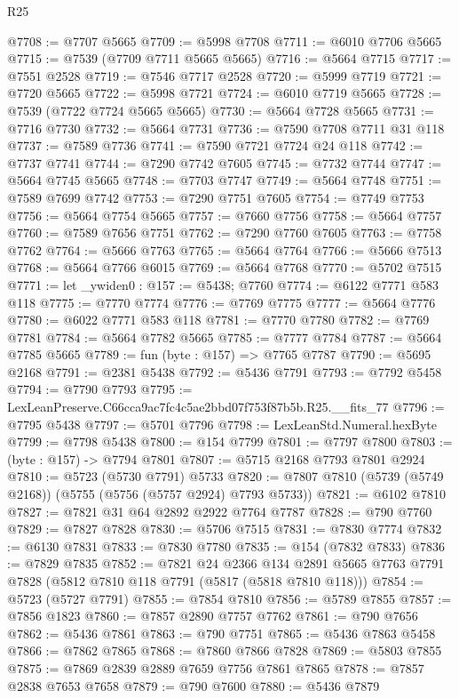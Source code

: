 \begin{lexlean}{R25}
\begin{coremodule}
@7708 := @7707 @5665
@7709 := @5998 @7708
@7711 := @6010 @7706 @5665
@7715 := @7539 (@7709 @7711 @5665 @5665)
@7716 := @5664 @7715
@7717 := @7551 @2528
@7719 := @7546 @7717 @2528
@7720 := @5999 @7719
@7721 := @7720 @5665
@7722 := @5998 @7721
@7724 := @6010 @7719 @5665
@7728 := @7539 (@7722 @7724 @5665 @5665)
@7730 := @5664 @7728 @5665
@7731 := @7716 @7730
@7732 := @5664 @7731
@7736 := @7590 @7708 @7711 @31 @118
@7737 := @7589 @7736
@7741 := @7590 @7721 @7724 @24 @118
@7742 := @7737 @7741
@7744 := @7290 @7742 @7605
@7745 := @7732 @7744
@7747 := @5664 @7745 @5665
@7748 := @7703 @7747
@7749 := @5664 @7748
@7751 := @7589 @7699 @7742
@7753 := @7290 @7751 @7605
@7754 := @7749 @7753
@7756 := @5664 @7754 @5665
@7757 := @7660 @7756
@7758 := @5664 @7757
@7760 := @7589 @7656 @7751
@7762 := @7290 @7760 @7605
@7763 := @7758 @7762
@7764 := @5666 @7763
@7765 := @5664 @7764
@7766 := @5666 @7513
@7768 := @5664 @7766 @6015
@7769 := @5664 @7768
@7770 := @5702 @7515
@7771 := let _ywiden0 : @157 := @5438; @7760
@7774 := @6122 @7771 @583 @118
@7775 := @7770 @7774
@7776 := @7769 @7775
@7777 := @5664 @7776
@7780 := @6022 @7771 @583 @118
@7781 := @7770 @7780
@7782 := @7769 @7781
@7784 := @5664 @7782 @5665
@7785 := @7777 @7784
@7787 := @5664 @7785 @5665
@7789 := fun (byte : @157) => @7765 @7787
@7790 := @5695 @2168
@7791 := @2381 @5438
@7792 := @5436 @7791
@7793 := @7792 @5458
@7794 := @7790 @7793
@7795 := LexLeanPreserve.C66cca9ac7fc4c5ae2bbd07f753f87b5b.R25.__fits_77
@7796 := @7795 @5438
@7797 := @5701 @7796
@7798 := LexLeanStd.Numeral.hexByte
@7799 := @7798 @5438
@7800 := @154 @7799
@7801 := @7797 @7800
@7803 := (byte : @157) -> @7794 @7801
@7807 := @5715 @2168 @7793 @7801 @2924
@7810 := @5723 (@5730 @7791) @5733
@7820 := @7807 @7810 (@5739 (@5749 @2168)) (@5755 (@5756 (@5757 @2924) @7793 @5733))
@7821 := @6102 @7810
@7827 := @7821 @31 @64 @2892 @2922 @7764 @7787
@7828 := @790 @7760
@7829 := @7827 @7828
@7830 := @5706 @7515
@7831 := @7830 @7774
@7832 := @6130 @7831
@7833 := @7830 @7780
@7835 := @154 (@7832 @7833)
@7836 := @7829 @7835
@7852 := @7821
    @24
    @2366
    @134
    @2891
    @5665
    @7763
    @7791
    @7828
    (@5812 @7810 @118 @7791 (@5817 (@5818 @7810 @118)))
@7854 := @5723 (@5727 @7791)
@7855 := @7854 @7810
@7856 := @5789 @7855
@7857 := @7856 @1823
@7860 := @7857 @2890 @7757 @7762
@7861 := @790 @7656
@7862 := @5436 @7861
@7863 := @790 @7751
@7865 := @5436 @7863 @5458
@7866 := @7862 @7865
@7868 := @7860 @7866 @7828
@7869 := @5803 @7855
@7875 := @7869 @2839 @2889 @7659 @7756 @7861 @7865
@7878 := @7857 @2838 @7653 @7658
@7879 := @790 @7600
@7880 := @5436 @7879

\end{coremodule}
\end{lexlean}
